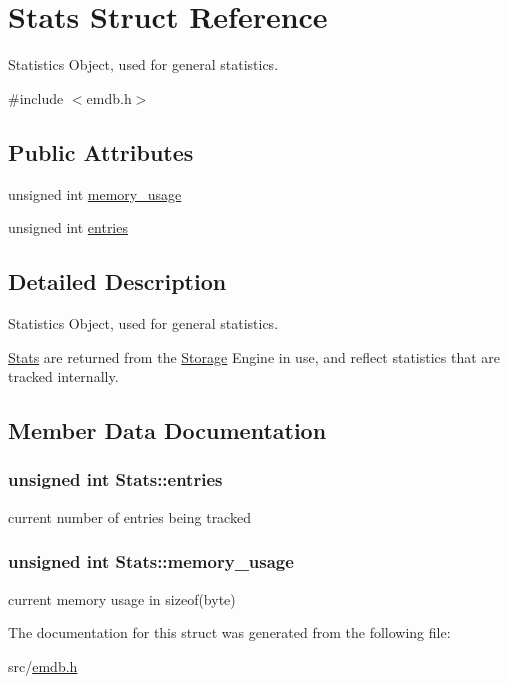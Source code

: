\hypertarget{struct_stats}{}\section{Stats Struct Reference}
\label{struct_stats}


Statistics Object, used for general statistics.  




{\ttfamily \#include $<$emdb.\+h$>$}

\subsection*{Public Attributes}
\begin{DoxyCompactItemize}
\item 
unsigned int \hyperlink{struct_stats_a35d46af7c6a28991267b36eb00b6f068}{memory\+\_\+usage}
\item 
unsigned int \hyperlink{struct_stats_ac67252d2eb80da338aea13868b19e863}{entries}
\end{DoxyCompactItemize}


\subsection{Detailed Description}
Statistics Object, used for general statistics. 

\hyperlink{struct_stats}{Stats} are returned from the \hyperlink{struct_storage}{Storage} Engine in use, and reflect statistics that are tracked internally. 

\subsection{Member Data Documentation}
\hypertarget{struct_stats_ac67252d2eb80da338aea13868b19e863}{}
\subsubsection[{entries}]{\setlength{\rightskip}{0pt plus 5cm}unsigned int Stats\+::entries}\label{struct_stats_ac67252d2eb80da338aea13868b19e863}
current number of entries being tracked \hypertarget{struct_stats_a35d46af7c6a28991267b36eb00b6f068}{}
\subsubsection[{memory\+\_\+usage}]{\setlength{\rightskip}{0pt plus 5cm}unsigned int Stats\+::memory\+\_\+usage}\label{struct_stats_a35d46af7c6a28991267b36eb00b6f068}
current memory usage in sizeof(byte) 

The documentation for this struct was generated from the following file\+:\begin{DoxyCompactItemize}
\item 
src/\hyperlink{emdb_8h}{emdb.\+h}\end{DoxyCompactItemize}

